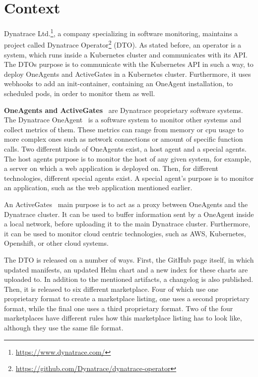 \chapter{Context}\label{ch:context}

Dynatrace Ltd.\footnote{\url{https://www.dynatrace.com/}}, a company specializing in software monitoring, maintains a project called Dynatrace Operator\footnote{\url{https://github.com/Dynatrace/dynatrace-operator}} (DTO).
As stated before, an operator is a system, which runs inside a Kubernetes cluster and communicates with its API.
The DTOs purpose is to communicate with the Kubernetes API in such a way, to deploy OneAgents and ActiveGates in a Kubernetes cluster.
Furthermore, it uses webhooks to add an init-container, containing an OneAgent installation, to scheduled pods, in order to monitor them as well.

\textbf{OneAgents and ActiveGates}~\cite{oneagents,activegates} are Dynatrace proprietary software systems.
The Dynatrace OneAgent~\cite{oneagents} is a software system to monitor other systems and collect metrics of them.
These metrics can range from memory or cpu usage to more complex ones such as network connections or amount of specific function calls.
Two different kinds of OneAgents exist, a host agent and a special agents.
The host agents purpose is to monitor the host of any given system, for example, a server on which a web application is deployed on.
Then, for different technologies, different special agents exist.
A special agent's purpose is to monitor an application, such as the web application mentioned earlier.

An ActiveGates~\cite{activegates} main purpose is to act as a proxy between OneAgents and the Dynatrace cluster.
It can be used to buffer information sent by a OneAgent inside a local network, before uploading it to the main Dynatrace cluster.
Furthermore, it can be used to monitor cloud centric technologies, such as AWS, Kubernetes, Openshift, or other cloud systems.

\pagebreak

The DTO is released on a number of ways.
First, the GitHub page itself, in which updated manifests, an updated Helm chart and a new index for these charts are uploaded to.
In addition to the mentioned artifacts, a changelog is also published.
Then, it is released to six different marketplace.
Four of which use one proprietary format to create a marketplace listing, one uses a second proprietary format, while the final one uses a third proprietary format.
Two of the four marketplaces have different rules how this marketplace listing has to look like, although they use the same file format.

